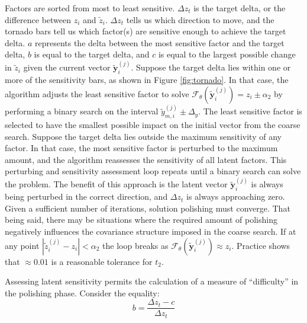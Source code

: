 Factors are sorted from most to least sensitive. $\Delta z_{t}$ is the target delta, or the difference between $z_{i}$ and $\tilde{z}_{i}$. $\Delta z_{t}$ tells us which direction to move, and the tornado bars tell us which factor(s) are sensitive enough to achieve the target delta. $a$ represents the delta between the most sensitive factor and the target delta, $b$ is equal to the target delta, and $c$ is equal to the largest possible change in $\tilde{z}_{i}$ given the current vector $\tilde{\mathbf{y}}_{i}^{(j)}$. Suppose the target delta lies within one or more of the sensitivity bars, as shown in Figure \ref{fig:tornado}. In that case, the algorithm adjusts the least sensitive factor to solve $\mathcal{F}_{\theta}(\tilde{\mathbf{y}}_{i}^{(j)}) = z_{i} \pm \alpha_{2}$ by performing a binary search \citep{nowak2008generalized} on the interval $\tilde{y}_{m, i}^{(j)} \pm \Delta_{y}$. The least sensitive factor is selected to have the smallest possible impact on the initial vector from the coarse search. Suppose the target delta lies outside the maximum sensitivity of any factor. In that case, the most sensitive factor is perturbed to the maximum amount, and the algorithm reassesses the sensitivity of all latent factors. This perturbing and sensitivity assessment loop repeats until a binary search can solve the problem. The benefit of this approach is the latent vector $\tilde{\mathbf{y}}_{i}^{(j)}$ is always being perturbed in the correct direction, and $\Delta z_{t}$ is always approaching zero. Given a sufficient number of iterations, solution polishing must converge. That being said, there may be situations where the required amount of polishing negatively influences the covariance structure imposed in the coarse search. If at any point $|\tilde{z}_{i}^{(j)} - z_{i}| < \alpha_{2}$ the loop breaks as $\mathcal{F}_{\theta}(\tilde{\mathbf{y}}_{i}^{(j)}) \approx z_{i}$. Practice shows that $\approx 0.01$ is a reasonable tolerance for $t_2$.

Assessing latent sensitivity permits the calculation of a measure of ``difficulty'' in the polishing phase. Consider the equality:
\begin{equation}
    b = \frac{\Delta z_{t} - c}{\Delta z_{t}}
    \label{eq:aoverb}
\end{equation}

